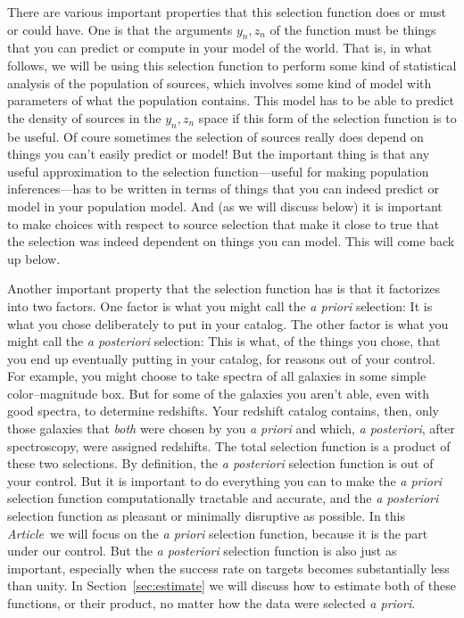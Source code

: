 \documentclass[modern]{aastex62}
\newcommand{\documentname}{\textsl{Article}}
\newcommand{\sectionname}{Section}
\newcommand{\foreign}[1]{\textsl{#1}}
\begin{document}
There are various important properties that this selection function
does or must or could have.
One is that the arguments $y_n, z_n$ of the function must be things
that you can predict or compute in your model of the world.
That is, in what follows, we will be using this selection function to
perform some kind of statistical analysis of the population of
sources, which involves some kind of model with parameters of what the
population contains.
This model has to be able to predict the density of sources in the
$y_n, z_n$ space if this form of the selection function is to be
useful.
Of coure sometimes the selection of sources really does depend on
things you can't easily predict or model!
But the important thing is that any useful approximation to the
selection function---useful for making population inferences---has to
be written in terms of things that you can indeed predict or model in
your population model.
And (as we will discuss below) it is important to make choices with
respect to source selection that make it close to true that the
selection was indeed dependent on things you can model.
This will come back up below.

Another important property that the selection function has is that it
factorizes into two factors.
One factor is what you might call the \foreign{a priori} selection:
It is what you chose deliberately to put in your catalog.
The other factor is what you might call the \foreign{a posteriori}
selection:
This is what, of the things you chose, that you end up eventually
putting in your catalog, for reasons out of your control.
For example, you might choose to take spectra of all galaxies in some
simple color--magnitude box.
But for some of the galaxies you aren't able, even with good spectra,
to determine redshifts.
Your redshift catalog contains, then, only those galaxies that
\emph{both} were chosen by you \foreign{a priori} and which,
\foreign{a posteriori}, after spectroscopy, were assigned redshifts.
The total selection function is a product of these two selections.
By definition, the \foreign{a posteriori} selection function is out of
your control.
But it is important to do everything you can to make the \foreign{a
  priori} selection function computationally tractable and accurate,
and the \foreign{a posteriori} selection function as pleasant or
minimally disruptive as possible.
In this \documentname\ we will focus on the \foreign{a priori}
selection function, because it is the part under our control.
But the \foreign{a posteriori} selection function is also just as
important, especially when the success rate on targets becomes
substantially less than unity.
In \sectionname~\ref{sec:estimate} we will discuss how to estimate
both of these functions, or their product, no matter how the data
were selected \foreign{a priori}.
\end{document}
